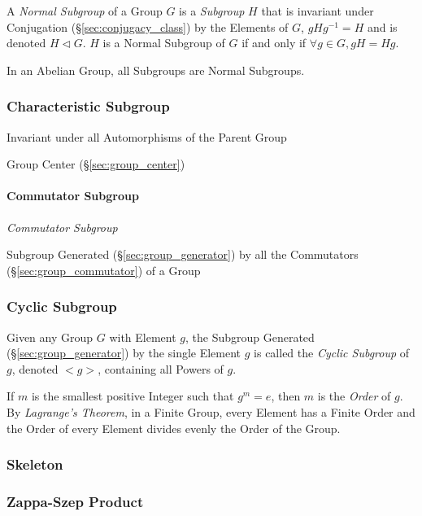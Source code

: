 A \emph{Normal Subgroup} of a Group $G$ is a \emph{Subgroup} $H$ that is
invariant under Conjugation (\S\ref{sec:conjugacy_class}) by the Elements of
$G$, $gHg^{-1} = H$ and is denoted $H \triangleleft G$. $H$ is a Normal Subgroup
of $G$ if and only if $\forall g \in G, gH = Hg$.

In an Abelian Group, all Subgroups are Normal Subgroups.



\subsubsection{Characteristic Subgroup}\label{sec:characteristic_subgroup}

Invariant under all Automorphisms of the Parent Group

Group Center (\S\ref{sec:group_center})



\paragraph{Commutator Subgroup}\label{sec:commutator_subgroup}\hfill

\emph{Commutator Subgroup}

Subgroup Generated (\S\ref{sec:group_generator}) by all the
Commutators (\S\ref{sec:group_commutator}) of a Group



\subsubsection{Cyclic Subgroup}\label{sec:cyclic_subgroup}

Given any Group $G$ with Element $g$, the Subgroup Generated
(\S\ref{sec:group_generator}) by the single Element $g$ is called the
\emph{Cyclic Subgroup} of $g$, denoted $<g>$, containing all Powers of
$g$.

If $m$ is the smallest positive Integer such that $g^m = e$, then $m$
is the \emph{Order} of $g$. By \emph{Lagrange's Theorem}, in a Finite
Group, every Element has a Finite Order and the Order of every Element
divides evenly the Order of the Group.



\subsubsection{Skeleton}\label{sec:group_skeleton}

\subsubsection{Zappa-Szep Product}\label{sec:zappa_szep}

